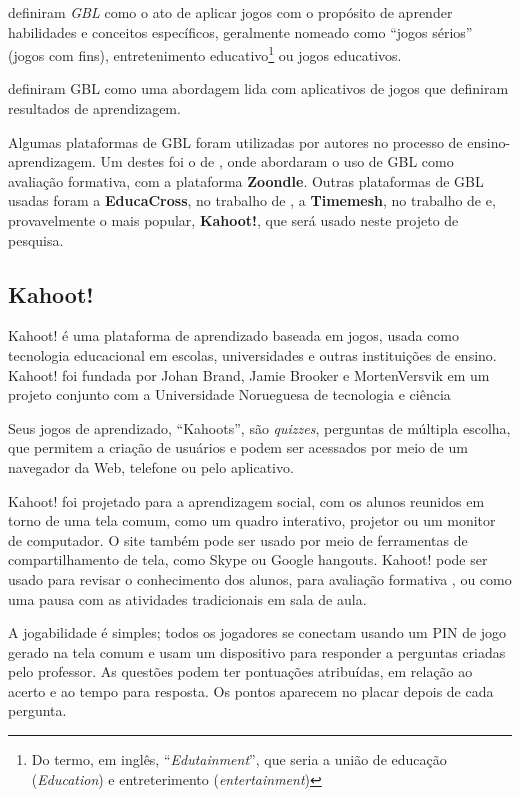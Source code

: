 \documentclass[
	12pt,				%
	openright,			%
	oneside,
	a4paper,			%
	english,			%
	french,				%
	spanish,			%
	brazil,				%
	]{abntex2}
\begin{document}
 definiram \textit{GBL} como o ato de aplicar jogos com o propósito de aprender habilidades e conceitos específicos, geralmente nomeado como “jogos sérios” (jogos com fins), entretenimento educativo\footnote{Do termo, em inglês, “\textit{Edutainment}”, que seria a união de educação (\textit{Education}) e entreterimento (\textit{entertainment})} ou jogos educativos.

 definiram GBL como uma abordagem lida com aplicativos de jogos que definiram resultados de aprendizagem.

Algumas plataformas de GBL foram utilizadas por autores no processo de ensino-aprendizagem. Um destes foi o de , onde abordaram o uso de GBL como avaliação formativa, com a plataforma \textbf{Zoondle}. Outras plataformas de GBL usadas foram a \textbf{EducaCross}, no trabalho de , a \textbf{Timemesh}, no trabalho de  e, provavelmente o mais popular, \textbf{Kahoot!}, que será usado neste projeto de pesquisa.

\subsection{Kahoot!}
\label{sec:Kahoot!}
Kahoot! é uma plataforma de aprendizado baseada em jogos, usada como tecnologia educacional em escolas, universidades e outras instituições de ensino. Kahoot! foi fundada por Johan Brand, Jamie Brooker e MortenVersvik em um projeto conjunto com a Universidade Norueguesa de tecnologia e ciência \cite{kahoot2018}

Seus jogos de aprendizado, ``Kahoots'', são \textit{quizzes}, perguntas de múltipla escolha, que permitem a criação de usuários e podem ser acessados por meio de um navegador da Web, telefone ou pelo aplicativo.

Kahoot! foi projetado para a aprendizagem social, com os alunos reunidos em torno de uma tela comum, como um quadro interativo, projetor ou um monitor de computador. O site também pode ser usado por meio de ferramentas de compartilhamento de tela, como Skype ou Google hangouts. Kahoot! pode ser usado para revisar o conhecimento dos alunos, para avaliação formativa \cite{kahootFormative}, ou como uma pausa com as atividades tradicionais em sala de aula. 

A jogabilidade é simples; todos os jogadores se conectam usando um PIN de jogo gerado na tela comum e usam um dispositivo para responder a perguntas criadas pelo professor. As questões podem ter pontuações atribuídas, em relação ao acerto e ao tempo para resposta. Os pontos aparecem no placar depois de cada pergunta.
\end{document}
